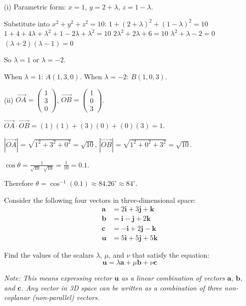 \begin{solution}[Sketch]
(i) Parametric form: $x = 1$, $y = 2 + \lambda$, $z = 1 - \lambda$. 

Substitute into $x^2 + y^2 + z^2 = 10$:
$1 + (2+\lambda)^2 + (1-\lambda)^2 = 10$
$1 + 4 + 4\lambda + \lambda^2 + 1 - 2\lambda + \lambda^2 = 10$
$2\lambda^2 + 2\lambda + 6 = 10$
$\lambda^2 + \lambda - 2 = 0$
$(\lambda + 2)(\lambda - 1) = 0$

So $\lambda = 1$ or $\lambda = -2$.

When $\lambda = 1$: $A(1, 3, 0)$. When $\lambda = -2$: $B(1, 0, 3)$.

(ii) $\overrightarrow{OA} = \begin{pmatrix} 1 \\ 3 \\ 0 \end{pmatrix}$, $\overrightarrow{OB} = \begin{pmatrix} 1 \\ 0 \\ 3 \end{pmatrix}$.

$\overrightarrow{OA} \cdot \overrightarrow{OB} = (1)(1) + (3)(0) + (0)(3) = 1$.

$|\overrightarrow{OA}| = \sqrt{1^2 + 3^2 + 0^2} = \sqrt{10}$, $|\overrightarrow{OB}| = \sqrt{1^2 + 0^2 + 3^2} = \sqrt{10}$.

$\cos\theta = \frac{1}{\sqrt{10} \cdot \sqrt{10}} = \frac{1}{10} = 0.1$.

Therefore $\theta = \cos^{-1}(0.1) \approx 84.26^\circ \approx 84^\circ$.
\end{solution}

\vspace{1em}


\begin{problem}
Consider the following four vectors in three-dimensional space:
\begin{align*}
\mathbf{a} &= 2\mathbf{i} + 3\mathbf{j} + \mathbf{k} \\
\mathbf{b} &= \mathbf{i} - \mathbf{j} + 2\mathbf{k} \\
\mathbf{c} &= -\mathbf{i} + 2\mathbf{j} - \mathbf{k} \\
\mathbf{u} &= 5\mathbf{i} + 5\mathbf{j} + 5\mathbf{k}
\end{align*}

Find the values of the scalars $\lambda$, $\mu$, and $\nu$ that satisfy the equation:
\[
\mathbf{u} = \lambda\mathbf{a} + \mu\mathbf{b} + \nu\mathbf{c}
\]

\textit{Note: This means expressing vector $\mathbf{u}$ as a linear combination of vectors $\mathbf{a}$, $\mathbf{b}$, and $\mathbf{c}$. Any vector in 3D space can be written as a combination of three non-coplanar (non-parallel) vectors.}
\end{problem}

